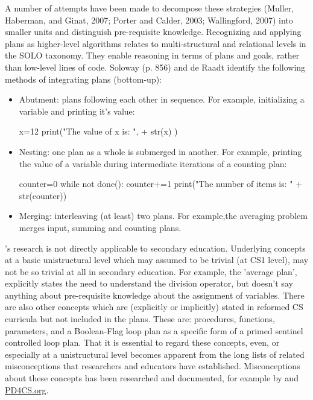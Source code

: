 A number of attempts have been made to decompose these strategies (Muller, Haberman, and Ginat, 2007; Porter and Calder, 2003; Wallingford, 2007) into smaller units and distinguish pre-requisite knowledge. Recognizing and applying plans as higher-level algorithms relates to multi-structural and relational levels in the SOLO taxonomy. They enable reasoning in terms of plans and goals, rather than low-level lines of code. Soloway (p. 856) and de Raadt identify the following methods of integrating plans (bottom-up):
\begin{itemize}
\item Abutment: plans following each other in sequence. For example, initializing a variable and printing it’s value:
\begin{PYTHON}
x=12
print("The value of x is: ", + str(x) )
\end{PYTHON}


\item Nesting: one plan as a whole is submerged in another. For example, printing the value of a variable during intermediate iterations of a counting plan:
\begin{PYTHON}
counter=0
while not done():
    counter+=1
    print("The number of items is: " + str(counter))
\end{PYTHON}

\item Merging: interleaving (at least) two plans. For example,the averaging problem merges input, summing and counting plans.
\end{itemize}

\citeauthor{deRaadt2009teachingPlans}'s research is not directly applicable to secondary education. Underlying concepts at a basic unistructural level which may assumed to be trivial (at CS1 level), may not be so trivial at all in secondary education. For example, the 'average plan', explicitly states the need to understand the division operator, but doesn't say anything about pre-requisite knowledge about the assignment of variables. There are also other concepts which are (explicitly or implicitly) stated in reformed CS curricula but not included in the plans. These are: procedures, functions, parameters, and a Boolean-Flag loop plan as a specific form of a primed sentinel controlled loop plan. That it is essential to regard these concepts, even, or especially at a unistructural level becomes apparent from the long lists of related misconceptions that researchers and educators have established. Misconceptions about these concepts has been researched and documented, for example by \citeauthor{sorva2012misconceptions} and \url{PD4CS.org}.



